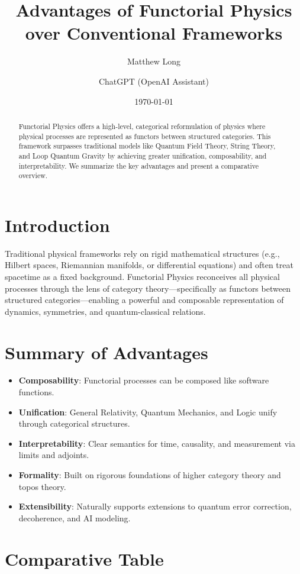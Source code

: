 \documentclass[11pt,a4paper]{article}
\title{Advantages of Functorial Physics over Conventional Frameworks}
\author[1]{Matthew Long}
\author[2]{ChatGPT (OpenAI Assistant)}
\affil[1]{Yoneda AI Research}
\affil[2]{OpenAI Research Assistant}
\date{\today}
\begin{document}
\maketitle

\begin{abstract}
Functorial Physics offers a high-level, categorical reformulation of physics where physical processes are represented as functors between structured categories. This framework surpasses traditional models like Quantum Field Theory, String Theory, and Loop Quantum Gravity by achieving greater unification, composability, and interpretability. We summarize the key advantages and present a comparative overview.
\end{abstract}

\section{Introduction}
Traditional physical frameworks rely on rigid mathematical structures (e.g., Hilbert spaces, Riemannian manifolds, or differential equations) and often treat spacetime as a fixed background. Functorial Physics reconceives all physical processes through the lens of category theory—specifically as functors between structured categories—enabling a powerful and composable representation of dynamics, symmetries, and quantum-classical relations.

\section{Summary of Advantages}

\begin{itemize}[leftmargin=2em]
  \item \textbf{Composability}: Functorial processes can be composed like software functions.
  \item \textbf{Unification}: General Relativity, Quantum Mechanics, and Logic unify through categorical structures.
  \item \textbf{Interpretability}: Clear semantics for time, causality, and measurement via limits and adjoints.
  \item \textbf{Formality}: Built on rigorous foundations of higher category theory and topos theory.
  \item \textbf{Extensibility}: Naturally supports extensions to quantum error correction, decoherence, and AI modeling.
\end{itemize}

\section{Comparative Table}
\end{document}
